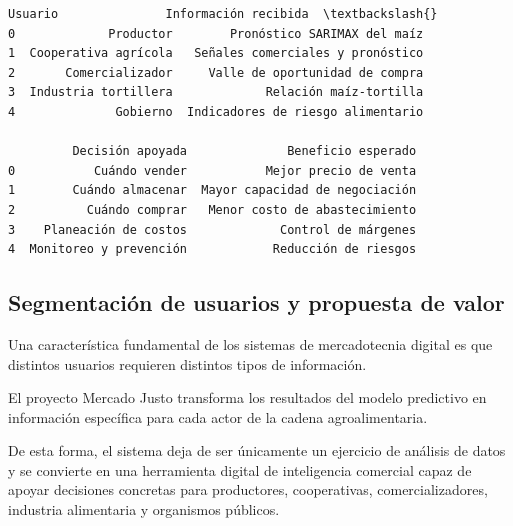\documentclass[11pt]{article}
\makeatletter
\newcommand{\boxspacing}{\kern\kvtcb@left@rule\kern\kvtcb@boxsep}
\newcommand{\prompt}[4]{
        {\ttfamily\llap{{\color{#2}[#3]:\hspace{3pt}#4}}\vspace{-\baselineskip}}
    }
\makeatother
\begin{document}
            \begin{tcolorbox}[breakable, size=fbox, boxrule=.5pt, pad at break*=1mm, opacityfill=0]
\prompt{Out}{outcolor}{320}{\boxspacing}
\begin{Verbatim}[commandchars=\\\{\}]
                Usuario               Información recibida  \textbackslash{}
0             Productor        Pronóstico SARIMAX del maíz
1  Cooperativa agrícola   Señales comerciales y pronóstico
2       Comercializador     Valle de oportunidad de compra
3  Industria tortillera             Relación maíz-tortilla
4              Gobierno  Indicadores de riesgo alimentario

         Decisión apoyada              Beneficio esperado
0           Cuándo vender           Mejor precio de venta
1        Cuándo almacenar  Mayor capacidad de negociación
2          Cuándo comprar   Menor costo de abastecimiento
3    Planeación de costos             Control de márgenes
4  Monitoreo y prevención            Reducción de riesgos
\end{Verbatim}
\end{tcolorbox}
        
    \hypertarget{segmentaciuxf3n-de-usuarios-y-propuesta-de-valor}{%
\subsection{Segmentación de usuarios y propuesta de
valor}\label{segmentaciuxf3n-de-usuarios-y-propuesta-de-valor}}

Una característica fundamental de los sistemas de mercadotecnia digital
es que distintos usuarios requieren distintos tipos de información.

El proyecto Mercado Justo transforma los resultados del modelo
predictivo en información específica para cada actor de la cadena
agroalimentaria.

De esta forma, el sistema deja de ser únicamente un ejercicio de
análisis de datos y se convierte en una herramienta digital de
inteligencia comercial capaz de apoyar decisiones concretas para
productores, cooperativas, comercializadores, industria alimentaria y
organismos públicos.
\end{document}
